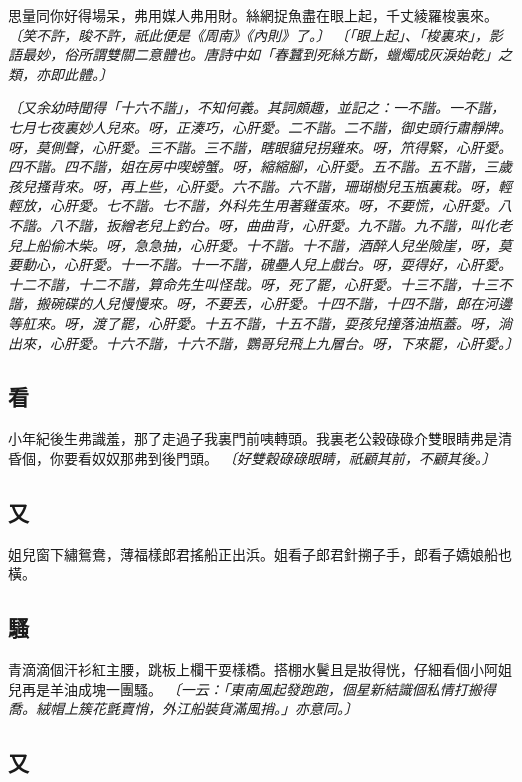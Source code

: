 思量同你好得場呆，弗用媒人弗用財。絲網捉魚盡在眼上起，千丈綾羅梭裏來。
\textit{〔笑不許，睃不許，祇此便是《周南》《內則》了。〕}
\textit{〔「眼上起」、「梭裏來」，影語最妙，俗所謂雙關二意體也。唐詩中如「春蠶到死絲方斷，蠟燭成灰淚始乾」之類，亦即此體。〕}

\textit{〔又余幼時聞得「十六不諧」，不知何義。其詞頗趣，並記之：一不諧。一不諧，七月七夜裏妙人兒來。呀，正湊巧，心肝愛。二不諧。二不諧，御史頭行肅靜牌。呀，莫側聲，心肝愛。三不諧。三不諧，瞎眼貓兒拐雞來。呀，笊得緊，心肝愛。四不諧。四不諧，姐在房中喫螃蟹。呀，縮縮腳，心肝愛。五不諧。五不諧，三歲孩兒搔背來。呀，再上些，心肝愛。六不諧。六不諧，珊瑚樹兒玉瓶裏栽。呀，輕輕放，心肝愛。七不諧。七不諧，外科先生用著雞蛋來。呀，不要慌，心肝愛。八不諧。八不諧，扳繒老兒上釣台。呀，曲曲背，心肝愛。九不諧。九不諧，叫化老兒上船偷木柴。呀，急急抽，心肝愛。十不諧。十不諧，酒醉人兒坐險崖，呀，莫要動心，心肝愛。十一不諧。十一不諧，磈壘人兒上戲台。呀，耍得好，心肝愛。十二不諧，十二不諧，算命先生叫怪哉。呀，死了罷，心肝愛。十三不諧，十三不諧，搬碗碟的人兒慢慢來。呀，不要丟，心肝愛。十四不諧，十四不諧，郎在河邊等舡來。呀，渡了罷，心肝愛。十五不諧，十五不諧，耍孩兒撞落油瓶蓋。呀，淌出來，心肝愛。十六不諧，十六不諧，鸚哥兒飛上九層台。呀，下來罷，心肝愛。〕}

\subsection*{看}

小年紀後生弗識羞，那了走過子我裏門前咦轉頭。我裏老公穀碌碌介雙眼睛弗是清昏個，你要看奴奴那弗到後門頭。
\textit{〔好雙穀碌碌眼睛，祇顧其前，不顧其後。〕}

\subsection*{又}

姐兒窗下繡鴛鴦，薄福樣郎君搖船正出浜。姐看子郎君針搠子手，郎看子嬌娘船也橫。

\subsection*{騷}

青滴滴個汗衫紅主腰，跳板上欄干耍樣橋。搭棚水鬢且是妝得恍，仔細看個小阿姐兒再是羊油成塊一團騷。
\textit{〔一云：「東南風起發跑跑，個星新結識個私情打搬得喬。絨帽上簇花氈賣悄，外江船裝貨滿風捎。」亦意同。〕}

\subsection*{又}

